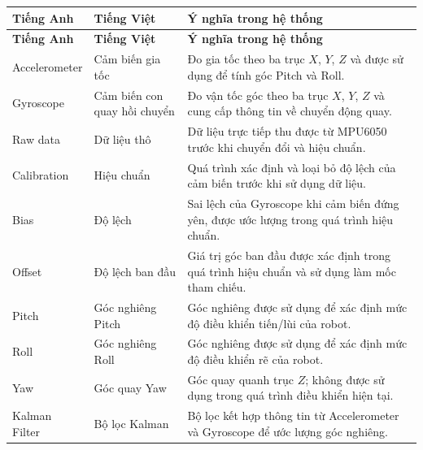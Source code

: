 \documentclass[a4paper,12pt]{report}
\begin{document}
\begin{longtable}{|p{3.5cm}|p{3.5cm}|p{7cm}|}

\hline
\textbf{Tiếng Anh} &
\textbf{Tiếng Việt} &
\textbf{Ý nghĩa trong hệ thống} \\
\hline
\endfirsthead

\hline
\textbf{Tiếng Anh} &
\textbf{Tiếng Việt} &
\textbf{Ý nghĩa trong hệ thống} \\
\hline
\endhead

    Accelerometer &
    Cảm biến gia tốc &
    Đo gia tốc theo ba trục $X$, $Y$, $Z$ và được sử dụng để tính góc Pitch và Roll. \\
    \hline

    Gyroscope &
    Cảm biến con quay hồi chuyển &
    Đo vận tốc góc theo ba trục $X$, $Y$, $Z$ và cung cấp thông tin về chuyển động quay. \\
    \hline

    Raw data &
    Dữ liệu thô &
    Dữ liệu trực tiếp thu được từ MPU6050 trước khi chuyển đổi và hiệu chuẩn. \\
    \hline

    Calibration &
    Hiệu chuẩn &
    Quá trình xác định và loại bỏ độ lệch của cảm biến trước khi sử dụng dữ liệu. \\
    \hline

    Bias &
    Độ lệch &
    Sai lệch của Gyroscope khi cảm biến đứng yên, được ước lượng trong quá trình hiệu chuẩn. \\
    \hline

    Offset &
    Độ lệch ban đầu &
    Giá trị góc ban đầu được xác định trong quá trình hiệu chuẩn và sử dụng làm mốc tham chiếu. \\
    \hline

    Pitch &
    Góc nghiêng Pitch &
    Góc nghiêng được sử dụng để xác định mức độ điều khiển tiến/lùi của robot. \\
    \hline

    Roll &
    Góc nghiêng Roll &
    Góc nghiêng được sử dụng để xác định mức độ điều khiển rẽ của robot. \\
    \hline

    Yaw &
    Góc quay Yaw &
    Góc quay quanh trục $Z$; không được sử dụng trong quá trình điều khiển hiện tại. \\
    \hline

    Kalman Filter &
    Bộ lọc Kalman &
    Bộ lọc kết hợp thông tin từ Accelerometer và Gyroscope để ước lượng góc nghiêng. \\
    \hline


\end{longtable}
\end{document}
